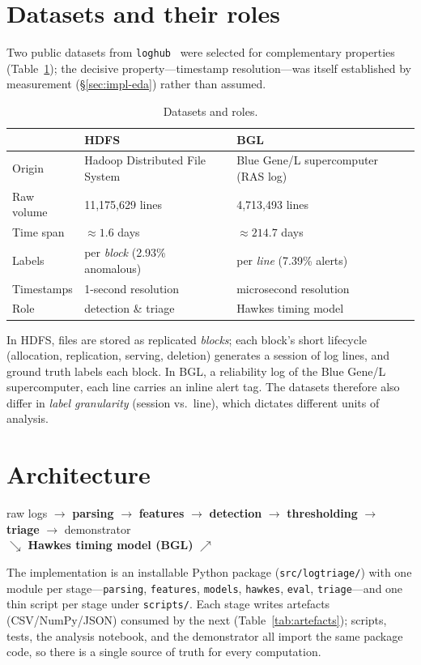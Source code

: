 \documentclass[11pt,a4paper]{report}
\newcommand{\code}[1]{\texttt{\small #1}}
\begin{document}
\section{Datasets and their roles}
\label{sec:method-data}
Two public datasets from \code{loghub}~\cite{loghub} were selected for
complementary properties (Table~\ref{tab:datasets}); the decisive
property---timestamp resolution---was itself established by measurement
(\S\ref{sec:impl-eda}) rather than assumed.

\begin{table}[H]
\centering
\caption{Datasets and roles.}
\label{tab:datasets}
\small
\renewcommand{\arraystretch}{1.25}
\begin{tabular}{@{}l l l@{}}
\toprule
 & \textbf{HDFS} & \textbf{BGL} \\
\midrule
Origin & Hadoop Distributed File System & Blue Gene/L supercomputer (RAS log) \\
Raw volume & 11{,}175{,}629 lines & 4{,}713{,}493 lines \\
Time span & $\approx1.6$ days & $\approx214.7$ days \\
Labels & per \emph{block} (2.93\% anomalous) & per \emph{line} (7.39\% alerts) \\
Timestamps & 1-second resolution & microsecond resolution \\
Role & detection \& triage & Hawkes timing model \\
\bottomrule
\end{tabular}
\end{table}

In HDFS, files are stored as replicated \emph{blocks}; each block's short
lifecycle (allocation, replication, serving, deletion) generates a session
of log lines, and ground truth labels each block. In BGL, a
reliability log of the Blue Gene/L supercomputer, each line carries an
inline alert tag. The datasets therefore also differ in \emph{label
granularity} (session vs.\ line), which dictates different units of
analysis.

\section{Architecture}
\label{sec:method-architecture}
\begin{center}
\small
raw logs $\to$ \textbf{parsing} $\to$ \textbf{features} $\to$
\textbf{detection} $\to$ \textbf{thresholding} $\to$ \textbf{triage} $\to$
demonstrator\\[2pt]
\hspace{3.4cm}$\searrow$ \textbf{Hawkes timing model (BGL)} $\nearrow$
\end{center}
The implementation is an installable Python package
(\code{src/logtriage/}) with one module per stage---\code{parsing},
\code{features}, \code{models}, \code{hawkes}, \code{eval},
\code{triage}---and one thin script per stage under \code{scripts/}. Each
stage writes artefacts (CSV/NumPy/JSON) consumed by the next
(Table~\ref{tab:artefacts}); scripts, tests, the analysis notebook, and the
demonstrator all import the same package code, so there is a single source
of truth for every computation.
\end{document}
